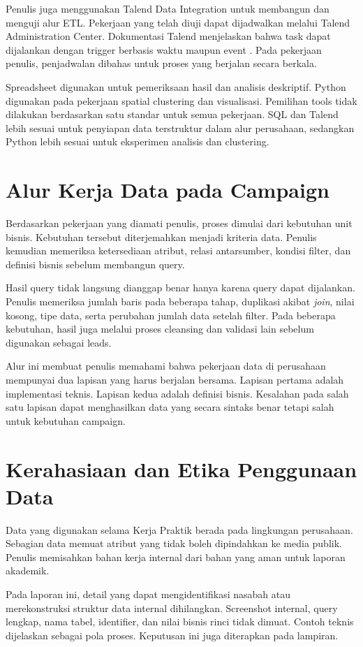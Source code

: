 Penulis juga menggunakan Talend Data Integration untuk membangun dan menguji alur ETL. Pekerjaan yang telah diuji dapat dijadwalkan melalui Talend Administration Center. Dokumentasi Talend menjelaskan bahwa task dapat dijalankan dengan trigger berbasis waktu maupun event \autocite{talend2026}. Pada pekerjaan penulis, penjadwalan dibahas untuk proses yang berjalan secara berkala.

Spreadsheet digunakan untuk pemeriksaan hasil dan analisis deskriptif. Python digunakan pada pekerjaan spatial clustering dan visualisasi. Pemilihan tools tidak dilakukan berdasarkan satu standar untuk semua pekerjaan. SQL dan Talend lebih sesuai untuk penyiapan data terstruktur dalam alur perusahaan, sedangkan Python lebih sesuai untuk eksperimen analisis dan clustering.

\section{Alur Kerja Data pada Campaign}
Berdasarkan pekerjaan yang diamati penulis, proses dimulai dari kebutuhan unit bisnis. Kebutuhan tersebut diterjemahkan menjadi kriteria data. Penulis kemudian memeriksa ketersediaan atribut, relasi antarsumber, kondisi filter, dan definisi bisnis sebelum membangun query.

Hasil query tidak langsung dianggap benar hanya karena query dapat dijalankan. Penulis memeriksa jumlah baris pada beberapa tahap, duplikasi akibat \textit{join}, nilai kosong, tipe data, serta perubahan jumlah data setelah filter. Pada beberapa kebutuhan, hasil juga melalui proses cleansing dan validasi lain sebelum digunakan sebagai leads.

Alur ini membuat penulis memahami bahwa pekerjaan data di perusahaan mempunyai dua lapisan yang harus berjalan bersama. Lapisan pertama adalah implementasi teknis. Lapisan kedua adalah definisi bisnis. Kesalahan pada salah satu lapisan dapat menghasilkan data yang secara sintaks benar tetapi salah untuk kebutuhan campaign.

\section{Kerahasiaan dan Etika Penggunaan Data}
Data yang digunakan selama Kerja Praktik berada pada lingkungan perusahaan. Sebagian data memuat atribut yang tidak boleh dipindahkan ke media publik. Penulis memisahkan bahan kerja internal dari bahan yang aman untuk laporan akademik.

Pada laporan ini, detail yang dapat mengidentifikasi nasabah atau merekonstruksi struktur data internal dihilangkan. Screenshot internal, query lengkap, nama tabel, identifier, dan nilai bisnis rinci tidak dimuat. Contoh teknis dijelaskan sebagai pola proses. Keputusan ini juga diterapkan pada lampiran.
